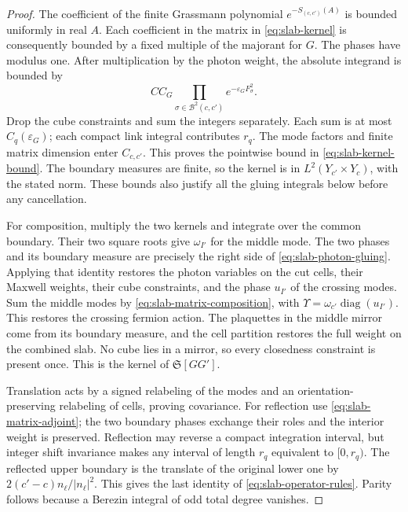 \documentclass[11pt,letterpaper,reqno]{amsart}
\DeclareMathOperator{\diag}{diag}
\begin{document}
\begin{proof}
The coefficient of the finite Grassmann polynomial
$e^{-S_{(c,c')}(A)}$ is bounded uniformly in real $A$. Each coefficient
in the matrix in \eqref{eq:slab-kernel} is consequently bounded by a
fixed multiple of the majorant for $G$. The phases have modulus one.
After multiplication by the photon weight, the absolute integrand is
bounded by
\[
 C C_G\prod_{\sigma\in\mathcal B^2(c,c')}
                           e^{-\varepsilon_GF_\sigma^2}.
\]
Drop the cube constraints and sum the integers separately. Each sum
is at most $C_q(\varepsilon_G)$; each compact link integral contributes
$r_q$. The mode factors and finite matrix dimension enter $C_{c,c'}$.
This proves the pointwise bound in \eqref{eq:slab-kernel-bound}.
The boundary measures are finite, so the kernel is in
$L^2(Y_{c'}\times Y_c)$, with the stated norm. These bounds also
justify all the gluing integrals below before any cancellation.

For composition, multiply the two kernels and integrate over the common
boundary. Their two square roots give $\omega_{I'}$ for the middle
mode. The two phases and its boundary measure are precisely the right
side of \eqref{eq:slab-photon-gluing}. Applying that identity restores
the photon variables on the cut cells, their Maxwell weights, their
cube constraints, and the phase $u_{I'}$ of the crossing modes. Sum
the middle modes by \eqref{eq:slab-matrix-composition}, with
$\Upsilon=\omega_{c'}\diag(u_{I'})$. This restores the crossing
fermion action. The plaquettes in the middle mirror come from its
boundary measure, and the cell partition restores the full weight on
the combined slab. No cube lies in a mirror, so every closedness
constraint is present once. This is the kernel of $\mathfrak S[GG']$.

Translation acts by a signed relabeling of the modes and an
orientation-preserving relabeling of cells, proving covariance.
For reflection use \eqref{eq:slab-matrix-adjoint}; the two boundary
phases exchange their roles and the interior weight is preserved.
Reflection may reverse a compact integration interval, but integer
shift invariance makes any interval of length $r_q$ equivalent to
$[0,r_q)$. The reflected upper boundary is the translate of the
original lower one by $2(c'-c)n_\ell/|n_\ell|^2$. This gives the last
identity of \eqref{eq:slab-operator-rules}. Parity follows because a
Berezin integral of odd total degree vanishes.


\end{proof}
\end{document}
